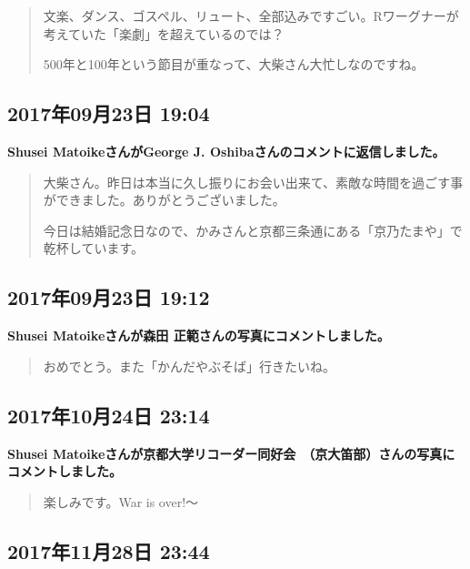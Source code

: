 \begin{quote}
文楽、ダンス、ゴスペル、リュート、全部込みですごい。Rワーグナーが考えていた「楽劇」を超えているのでは？

500年と100年という節目が重なって、大柴さん大忙しなのですね。
\end{quote}

\subsection*{2017年09月23日 19:04}

\textbf{Shusei MatoikeさんがGeorge J. Oshibaさんのコメントに返信しました。}

\begin{quote}
大柴さん。昨日は本当に久し振りにお会い出来て、素敵な時間を過ごす事ができました。ありがとうございました。

今日は結婚記念日なので、かみさんと京都三条通にある「京乃たまや」で乾杯しています。
\end{quote}

\subsection*{2017年09月23日 19:12}

\textbf{Shusei Matoikeさんが森田 正範さんの写真にコメントしました。}

\begin{quote}
おめでとう。また「かんだやぶそば」行きたいね。
\end{quote}

\subsection*{2017年10月24日 23:14}

\textbf{Shusei Matoikeさんが京都大学リコーダー同好会　（京大笛部）さんの写真にコメントしました。}

\begin{quote}
楽しみです。War is over!〜
\end{quote}

\subsection*{2017年11月28日 23:44}

